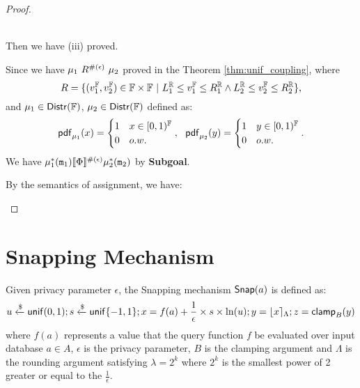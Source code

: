 \documentclass[a4paper,11pt]{article}
\begin{document}
\begin{proof}
\begin{itemize}
\begin{subproof}
	\\
	Then we have (iii) proved. 
	\end{subproof}
	Since we have ${\mu_1} ~ R^{\#(\epsilon)} ~ {\mu_2}$ proved in the Theorem \ref{thm:unif_coupling},
	where 
	\[ R = 
			\{(v^{\mathbb{F}}_1, v^{\mathbb{F}}_2) \in \mathbb{F} \times \mathbb{F} 
			~|~
			L^{\mathbb{R}}_1 \leq v^{\mathbb{F}}_1 \leq R^{\mathbb{R}}_1 
			\land 
			L^{\mathbb{R}}_2 \leq v^{\mathbb{F}}_2 \leq R^{\mathbb{R}}_2
			\},
	\]
	and ${\mu_1} \in \mathsf{Distr}(\mathbb{F})$, ${\mu_2} \in \mathsf{Distr}(\mathbb{F})$ defined as:
	\[
		\mathsf{pdf}_{\mu_1}(x) = 
		\begin{cases}
		1 & x \in [0, 1)^{\mathbb{F}} 
		\\
		0       & o.w.
		\end{cases} ,
		~~
		\mathsf{pdf}_{\mu_2}(y) = 
		\begin{cases}
		1 & y \in [0, 1)^{\mathbb{F}}
		\\
		0       & o.w.
		\end{cases}.
	\]	
	We have $\mu^*_1(\mathtt{m}_1) \llbracket \Phi \rrbracket^{\#(\epsilon)} \mu^*_2(\mathtt{m}_2)$ by \textbf{Subgoal}.



	By the semantics of assignment, we have:\\
	\end{itemize}
\end{proof}


\newpage
\section{Snapping Mechanism}

\begin{defn}
Given privacy parameter $\epsilon$, the Snapping mechanism $\mathsf{Snap}(a)$ is defined as:
\[
	u \xleftarrow{\$} \mathsf{unif}(0,1); s \xleftarrow{\$} \mathsf{unif}\{-1, 1\};
	x = f(a) + \frac{1}{\epsilon} \times s \times \ln (u);
	y = \lfloor x \rceil_{\Lambda};
	z = \mathsf{clamp}_B (y)
\]
where $f(a)$ represents a value that the query function $f$ be evaluated over input database $a \in A$, $\epsilon$ is the privacy parameter, $B$ is the clamping argument and $\Lambda$ is the rounding argument satisfying $\lambda = 2^k$ where $2^k$ is the smallest power of 2 greater or equal to the $\frac{1}{\epsilon}$.
\end{defn}
\end{document}

